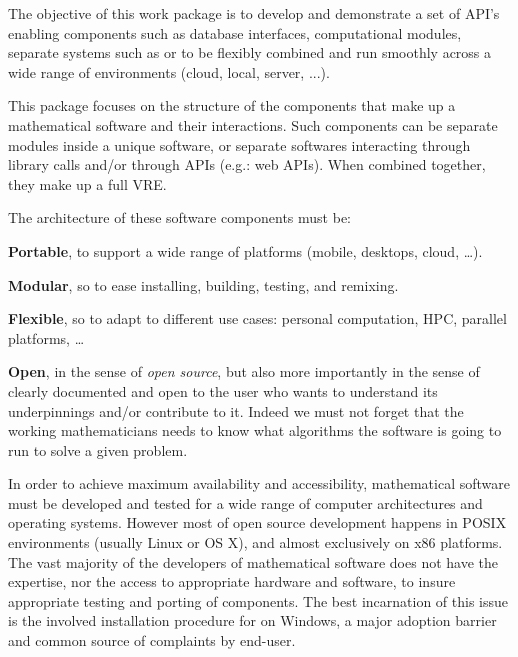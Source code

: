 \begin{workpackage}[id=component-architecture,wphases=0-48!.5,
  title=Component Architecture,lead=UV,
  PSRM=24,UVRM=8,SARM=16, USHRM=4]

  \begin{wpobjectives}
    The objective of this work package is to develop and demonstrate a
    set of API's enabling components such as database interfaces,
    computational modules, separate systems such as \GAP or \Sage to
    be flexibly combined and run smoothly across a wide range of
    environments (cloud, local, server, ...).
  \end{wpobjectives}

  \begin{wpdescription}
    This package focuses on the structure of the components that make
    up a mathematical software and their interactions. Such components
    can be separate modules inside a unique software, or separate
    softwares interacting through library calls and/or through APIs
    (e.g.: web APIs). When combined together, they make up a full VRE.

    The architecture of these software components must be:
    \begin{compactitem}
    \item \textbf{Portable}, to support a wide range of platforms
      (mobile, desktops, cloud, \dots).
    \item \textbf{Modular}, so to ease installing, building, testing,
      and remixing.
    \item \textbf{Flexible}, so to adapt to different use cases:
      personal computation, HPC, parallel platforms, \dots
    \item \textbf{Open}, in the sense of \emph{open source}, but also
      more importantly in the sense of clearly documented and open to
      the user who wants to understand its underpinnings and/or
      contribute to it. Indeed we must not forget that the working
      mathematicians needs to know what algorithms the software is
      going to run to solve a given problem.
    \end{compactitem}
  \end{wpdescription}

  \begin{tasklist}
  \begin{task}[id=portability,title=Portability,lead=UV,PM=28]
    In order to achieve maximum availability and accessibility,
    mathematical software must be developed and tested for a wide range
    of computer architectures and operating systems.  However most of
    open source development happens in POSIX environments (usually
    Linux or OS X), and almost exclusively on x86 platforms.  The vast
    majority of the developers of mathematical software does not have
    the expertise, nor the access to appropriate hardware and software, to insure
    appropriate testing and porting of components.  The best
    incarnation of this issue is the involved installation procedure
    for \Sage on Windows, a major adoption barrier and common source of
    complaints by end-user.


\end{task}
\end{tasklist}
\end{workpackage}
